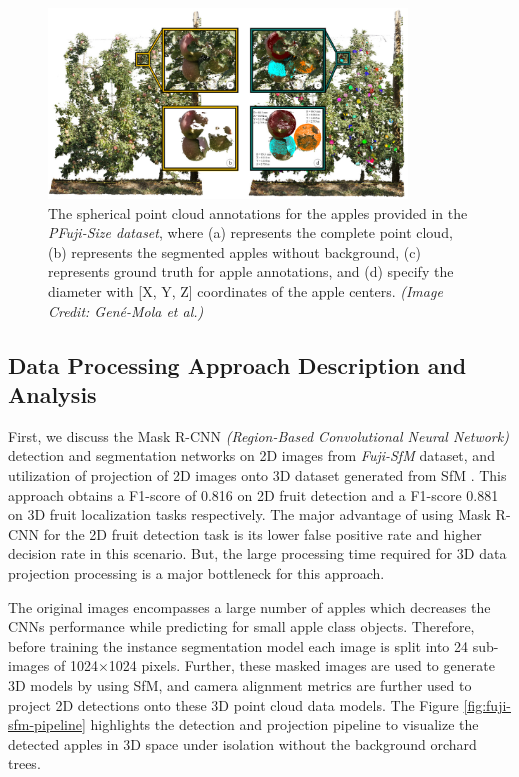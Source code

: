 \documentclass{article}
\begin{document}
\begin{figure}[h]
    \centering
    \includegraphics[width=0.85\textwidth]{pfuji-size-dataset.png}
    \caption{The spherical point cloud annotations for the apples provided in the \textit{PFuji-Size dataset}, where (a) represents the complete point cloud, (b) represents the segmented apples without background, (c) represents ground truth for apple annotations, and (d) specify the diameter with [X, Y, Z] coordinates of the apple centers. \textit{(Image Credit: Gen{\'e}-Mola et al.)}}
    \label{fig:fuji-size}
\end{figure}


\subsection{Data Processing Approach Description and Analysis}


First, we discuss the Mask R-CNN \textit{(Region-Based Convolutional Neural Network)} detection and segmentation networks on 2D images from \textit{Fuji-SfM} dataset, and utilization of projection of 2D images onto 3D dataset generated from SfM \cite{he2017mask, gene2020fruit}.
This approach obtains a F1-score of 0.816 on 2D fruit detection and a F1-score 0.881 on 3D fruit localization tasks respectively.
The major advantage of using Mask R-CNN for the 2D fruit detection task is its lower false positive rate and higher decision rate in this scenario.
But, the large processing time required for 3D data projection processing is a major bottleneck for this approach.


The original images encompasses a large number of apples which decreases the CNNs performance while predicting for small apple class objects.
Therefore, before training the instance segmentation model each image is split into 24 sub-images of 1024$\times$1024 pixels.
Further, these masked images are used to generate 3D models by using SfM, and camera alignment metrics are further used to project 2D detections onto these 3D point cloud data models. 
The Figure \ref{fig:fuji-sfm-pipeline} highlights the detection and projection pipeline to visualize the detected apples in 3D space under isolation without the background orchard trees.
\end{document}
